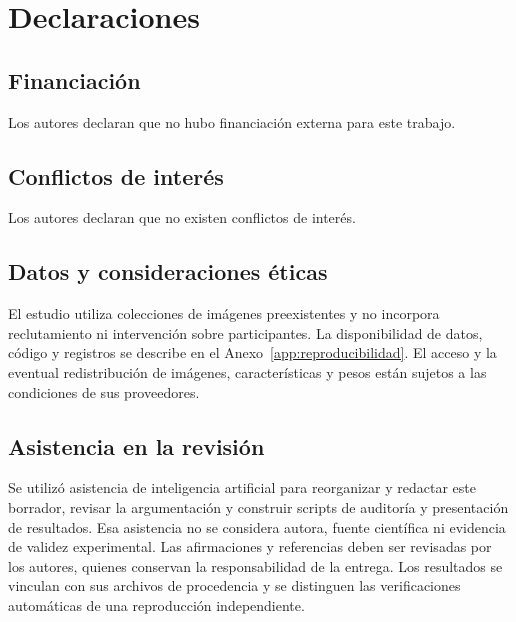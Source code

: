\chapter*{Declaraciones}

\section*{Financiación}
Los autores declaran que no hubo financiación externa para este trabajo.

\section*{Conflictos de interés}
Los autores declaran que no existen conflictos de interés.

\section*{Datos y consideraciones éticas}
El estudio utiliza colecciones de imágenes preexistentes y no incorpora reclutamiento ni intervención sobre participantes. La disponibilidad de datos, código y registros se describe en el Anexo~\ref{app:reproducibilidad}. El acceso y la eventual redistribución de imágenes, características y pesos están sujetos a las condiciones de sus proveedores.

\section*{Asistencia en la revisión}
Se utilizó asistencia de inteligencia artificial para reorganizar y redactar este borrador, revisar la argumentación y construir scripts de auditoría y presentación de resultados. Esa asistencia no se considera autora, fuente científica ni evidencia de validez experimental. Las afirmaciones y referencias deben ser revisadas por los autores, quienes conservan la responsabilidad de la entrega. Los resultados se vinculan con sus archivos de procedencia y se distinguen las verificaciones automáticas de una reproducción independiente.
